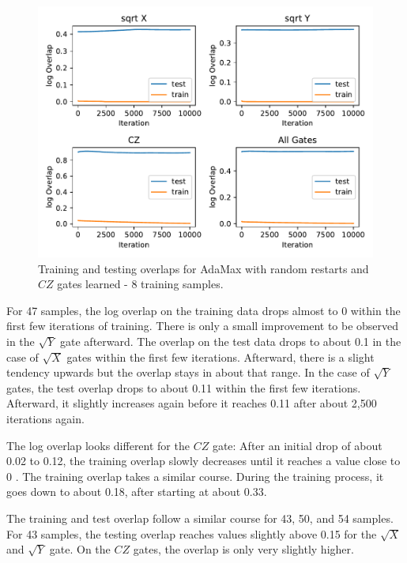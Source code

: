 \begin{figure}[H]
  \centering
  \includegraphics[width=\textwidth]{figures/results/AM-restarts-learned/avgOverlap_8.pdf}
  \caption[Training and Testing Overlaps for AdaMax with Random Restarts and $CZ$ Gates Learned - 8 Samples]{
  Training and testing overlaps for AdaMax with random restarts and $CZ$ gates learned - 8 training samples.}
  \label{fig:am_overlap_8}
\end{figure}

For 47 samples, the log overlap on the training data drops almost to 0 within the first few iterations 
of training. There is only a small improvement to be observed in the $\sqrt{Y}$ gate afterward. 
The overlap on the test data drops to about 0.1 in the case of $\sqrt{X}$ gates within the first few iterations.
Afterward, there is a slight tendency upwards but the overlap stays in about that range. In the case 
of $\sqrt{Y}$ gates, the test overlap drops to about 0.11 within the first few iterations. Afterward, 
it slightly increases again before it reaches 0.11 after about 2,500 iterations again.

The log overlap looks different for the $CZ$ gate: After an initial drop of about 0.02 to 0.12, the 
training overlap slowly decreases until it reaches a value close to 0 . The 
training overlap takes a similar course. During the training process, it goes down to about 0.18, after 
starting at about 0.33.

The training and test overlap follow a similar course for 43, 50, and 54 samples. For 43 samples, the 
testing overlap reaches values slightly above 0.15 for the $\sqrt{X}$ and $\sqrt{Y}$ gate. On the $CZ$ gates, 
the overlap is only very slightly higher.


